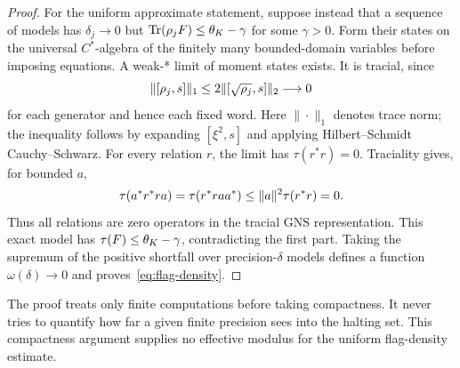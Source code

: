 \begin{proof}
For the uniform approximate statement, suppose instead that a sequence of models has $\delta_j\to0$ but $\operatorname{Tr}(\rho_jF)\le\theta_K-\gamma$ for some $\gamma>0$. Form their states on the universal $C^*$-algebra of the finitely many bounded-domain variables before imposing equations. A weak-* limit of moment states exists. It is tracial, since
\[
 \lVert[\rho_j,s]\rVert_1\le2\lVert[\sqrt{\rho_j},s]\rVert_2\longrightarrow0
\]
for each generator and hence each fixed word. Here $\|\cdot\|_1$ denotes trace norm; the inequality follows by expanding $[\xi^2,s]$ and applying Hilbert--Schmidt Cauchy--Schwarz. For every relation $r$, the limit has $\tau(r^*r)=0$. Traciality gives, for bounded $a$,
\[
 \tau(a^*r^*ra)=\tau(r^*raa^*)\le\lVert a\rVert^2\tau(r^*r)=0.
\]
Thus all relations are zero operators in the tracial GNS representation. This exact model has $\tau(F)\le\theta_K-\gamma$, contradicting the first part. Taking the supremum of the positive shortfall over precision-$\delta$ models defines a function $\omega(\delta)\to0$ and proves~\eqref{eq:flag-density}.
\end{proof}

The proof treats only finite computations before taking compactness. It never tries to quantify how far a given finite precision sees into the halting set. This compactness argument supplies no effective modulus for the uniform flag-density estimate.

